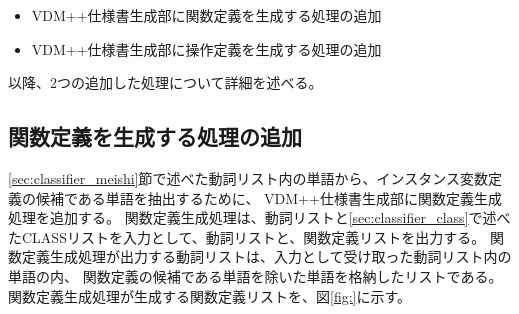 \begin{itemize}
    \item VDM++仕様書生成部に関数定義を生成する処理の追加
    \item VDM++仕様書生成部に操作定義を生成する処理の追加
\end{itemize}

以降、2つの追加した処理について詳細を述べる。

\subsection{関数定義を生成する処理の追加}
\ref{sec:classifier_meishi}節で述べた動詞リスト内の単語から、インスタンス変数定義の候補である単語を抽出するために、
VDM++仕様書生成部に関数定義生成処理を追加する。
関数定義生成処理は、動詞リストと\ref{sec:classifier_class}で述べたCLASSリストを入力として、動詞リストと、関数定義リストを出力する。
関数定義生成処理が出力する動詞リストは、入力として受け取った動詞リスト内の単語の内、
関数定義の候補である単語を除いた単語を格納したリストである。
関数定義生成処理が生成する関数定義リストを、図\ref{fig:}に示す。